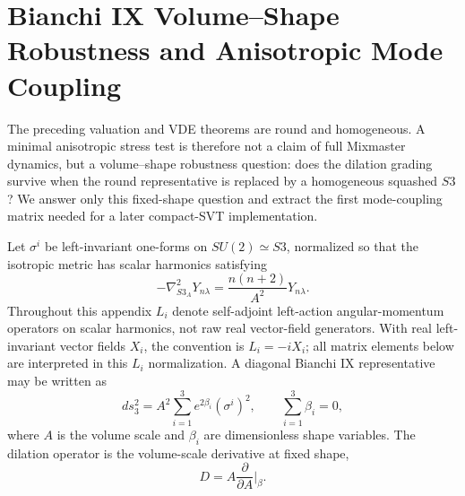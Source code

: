 \documentclass[11pt,a4paper]{article}
\def\Sthree{S3}%
\def\dd{d}%
\def\Dil{D}%
\numberwithin{equation}{section}
\theoremstyle{definition}
\theoremstyle{plain}
\theoremstyle{remark}
\newcommand{\Sthree}{S^3}
\newcommand{\Dil}{\mathscr{D}}
\newcommand{\dd}{\mathrm{d}}
\begin{document}
\appendix
\section{Bianchi IX Volume--Shape Robustness and Anisotropic Mode Coupling}
\label{sec:bianchi-ix}

The preceding valuation and VDE theorems are round and homogeneous.  A minimal
anisotropic stress test is therefore not a claim of full Mixmaster dynamics, but
a volume--shape robustness question: does the dilation grading survive when the
round representative is replaced by a homogeneous squashed \(\Sthree\)?  We answer
only this fixed-shape question and extract the first mode-coupling matrix needed
for a later compact-SVT implementation.

Let \(\sigma^i\) be left-invariant one-forms on \(SU(2)\simeq\Sthree\), normalized so that the isotropic metric has scalar harmonics satisfying
\begin{equation}
-\nabla^2_{\Sthree_A}Y_{n\lambda}=\frac{n(n+2)}{A^2}Y_{n\lambda}.
\end{equation}
Throughout this appendix \(L_i\) denote self-adjoint left-action angular-momentum
operators on scalar harmonics, not raw real vector-field generators.  With real
left-invariant vector fields \(X_i\), the convention is \(L_i=-iX_i\); all
matrix elements below are interpreted in this \(L_i\) normalization.
A diagonal Bianchi IX representative may be written as
\begin{equation}
\dd s_3^2=A^2\sum_{i=1}^3 e^{2\beta_i}(\sigma^i)^2,
\qquad
\sum_{i=1}^3\beta_i=0,
\label{eq:BIX-metric}
\end{equation}
where \(A\) is the volume scale and \(\beta_i\) are dimensionless shape variables.
The dilation operator is the volume-scale derivative at fixed shape,
\begin{equation}
\Dil=A\frac{\partial}{\partial A}\Big|_{\beta}.
\end{equation}
\end{document}
